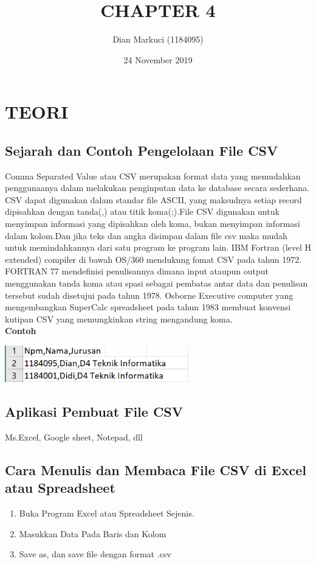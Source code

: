 \documentclass{article}
\title{CHAPTER 4}
\author{Dian Markuci (1184095)}
\date{24 November 2019}
\begin{document}
\maketitle

\section{TEORI}
\subsection{ Sejarah dan Contoh Pengelolaan File CSV}
Comma Separated Value atau CSV merupakan format data yang memudahkan penggunaanya dalam melakukan penginputan data ke database secara sederhana. CSV dapat digunakan dalam standar ﬁle ASCII, yang maksudnya setiap record dipisahkan dengan tanda(,) atau titik koma(;).File CSV digunakan untuk menyimpan informasi yang dipisahkan oleh koma, bukan menyimpan informasi dalam kolom.Dan jika teks dan angka disimpan dalam ﬁle csv maka mudah untuk memindahkannya dari satu program ke program lain. IBM Fortran (level H extended) compiler di bawah OS/360 mendukung fomat CSV pada tahun 1972. FORTRAN 77 mendeﬁnisi penulisannya dimana input ataupun output menggunakan tanda koma atau spasi sebagai pembatas antar data dan penulisan tersebut sudah disetujui pada tahun 1978. Osborne Executive computer yang mengembangkan SuperCalc spreadsheet pada tahun 1983 membuat konvensi kutipan CSV yang memungkinkan string mengandung koma.\\

\textbf{Contoh}
\begin{center}
    \includegraphics[width=8cm]{figure/contoh.png}
\end{center}

\subsection{Aplikasi Pembuat File CSV}
Ms.Excel, Google sheet, Notepad, dll

\subsection{Cara Menulis dan Membaca File CSV di Excel atau Spreadsheet}
\begin{enumerate}
    \item Buka Program Excel atau Spreadsheet Sejenis.
    \item Masukkan Data Pada Baris dan Kolom
    \item Save as, dan save ﬁle dengan format .csv
\end{enumerate}
\end{document}
